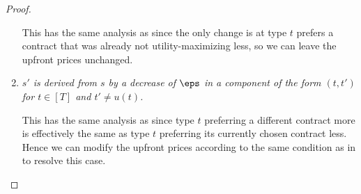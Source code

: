 \begin{proof}
\begin{enumerate}
        This has the same analysis as  since the only change is at type $t$ prefers a contract that was already not utility-maximizing less, so we can leave the upfront prices unchanged.

        \item[\tbf{Case 4:}] \emph{$s'$ is derived from $s$ by a decrease of $\eps$ in a component of the form $(t,t')$ for $t\in [T]$ and $t' \neq u(t)$.}

        This has the same analysis as  since type $t$ preferring a different contract more is effectively the same as type $t$ preferring its currently chosen contract less. Hence we can modify the upfront prices according to the same condition as in  to resolve this case.
    \end{enumerate}
    \end{proof}

    


    
